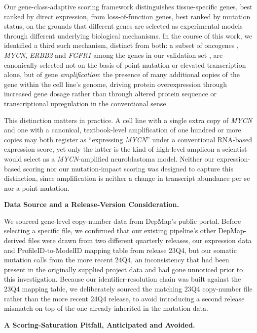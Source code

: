\documentclass[author={Karen Coutinho, Ishaan Bhalla, Aman Raj, Dixit Kaloorani Malarmannan},
                supervisor={Dr. Daniel D'Andrea},
                degree={MSc},
                title={CellSelector Omics: A Multi-Omics Recommendation System for Cell Line Selection},
                subtitle={},
                type={},
                year={2026}]{dissertation}
\begin{document}
Our gene-class-adaptive scoring framework distinguishes tissue-specific genes, best ranked by direct expression, from loss-of-function genes, best ranked by mutation status, on the grounds that different genes are selected as experimental models through different underlying biological mechanisms. In the course of this work, we identified a third such mechanism, distinct from both: a subset of oncogenes , \textit{MYCN}, \textit{ERBB2} and \textit{FGFR1} among the genes in our validation set , are canonically selected not on the basis of point mutation or elevated transcription alone, but of gene \textit{amplification}: the presence of many additional copies of the gene within the cell line's genome, driving protein overexpression through increased gene dosage rather than through altered protein sequence or transcriptional upregulation in the conventional sense.

This distinction matters in practice. A cell line with a single extra copy of \textit{MYCN} and one with a canonical, textbook-level amplification of one hundred or more copies may both register as ``expressing \textit{MYCN}'' under a conventional RNA-based expression score, yet only the latter is the kind of high-level amplicon a scientist would select as a \textit{MYCN}-amplified neuroblastoma model. Neither our expression-based scoring nor our mutation-impact scoring was designed to capture this distinction, since amplification is neither a change in transcript abundance per se nor a point mutation.

{\bf Data Source and a Release-Version Consideration.}

We sourced gene-level copy-number data from DepMap's public portal. Before selecting a specific file, we confirmed that our existing pipeline's other DepMap-derived files were drawn from two different quarterly releases, our expression data and ProfileID-to-ModelID mapping table from release 23Q4, but our somatic mutation calls from the more recent 24Q4, an inconsistency that had been present in the originally supplied project data and had gone unnoticed prior to this investigation. Because our identifier-resolution chain was built against the 23Q4 mapping table, we deliberately sourced the matching 23Q4 copy-number file rather than the more recent 24Q4 release, to avoid introducing a second release mismatch on top of the one already inherited in the mutation data.

{\bf A Scoring-Saturation Pitfall, Anticipated and Avoided.}
\end{document}
